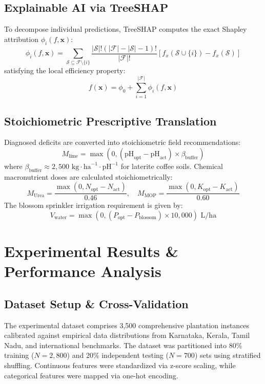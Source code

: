 \documentclass[conference]{IEEEtran}
\begin{document}
\subsection{Explainable AI via TreeSHAP}
To decompose individual predictions, TreeSHAP \cite{lundberg2020} computes the exact Shapley attribution $\phi_i(f, \mathbf{x})$:
\begin{equation}
\phi_i(f, \mathbf{x}) = \sum_{\mathcal{S} \subseteq \mathcal{F} \setminus \{i\}} \frac{|\mathcal{S}|!(|\mathcal{F}| - |\mathcal{S}| - 1)!}{|\mathcal{F}|!} \left[ f_x(\mathcal{S} \cup \{i\}) - f_x(\mathcal{S}) \right]
\end{equation}
satisfying the local efficiency property:
\begin{equation}
f(\mathbf{x}) = \phi_0 + \sum_{i=1}^{|\mathcal{F}|} \phi_i(f, \mathbf{x})
\end{equation}

\subsection{Stoichiometric Prescriptive Translation}
Diagnosed deficits are converted into stoichiometric field recommendations:
\begin{equation}
M_{\text{lime}} = \max\left(0, (\text{pH}_{\text{opt}} - \text{pH}_{\text{act}}) \times \beta_{\text{buffer}}\right)
\end{equation}
where $\beta_{\text{buffer}} \approx 2,500\text{ kg}\cdot\text{ha}^{-1}\cdot\text{pH}^{-1}$ for laterite coffee soils. Chemical macronutrient doses are calculated stoichiometrically:
\begin{equation}
M_{\text{Urea}} = \frac{\max(0, N_{\text{opt}} - N_{\text{act}})}{0.46}, \quad M_{\text{MOP}} = \frac{\max(0, K_{\text{opt}} - K_{\text{act}})}{0.60}
\end{equation}
The blossom sprinkler irrigation requirement is given by:
\begin{equation}
V_{\text{water}} = \max\left(0, (P_{\text{opt}} - P_{\text{blossom}}) \times 10,000\right) \text{ L/ha}
\end{equation}

\section{Experimental Results \& Performance Analysis}

\subsection{Dataset Setup \& Cross-Validation}
The experimental dataset comprises 3,500 comprehensive plantation instances calibrated against empirical data distributions from Karnataka, Kerala, Tamil Nadu, and international benchmarks. The dataset was partitioned into 80\% training ($N = 2,800$) and 20\% independent testing ($N = 700$) sets using stratified shuffling. Continuous features were standardized via z-score scaling, while categorical features were mapped via one-hot encoding.
\end{document}
